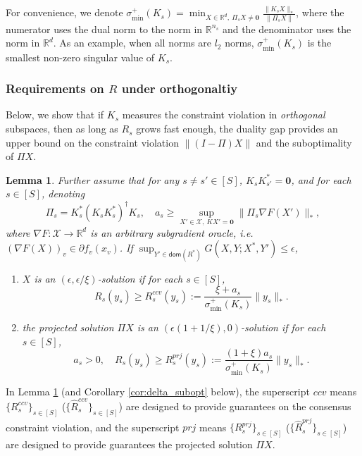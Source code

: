\documentclass[10pt]{article}
\newcommand{\mc}{\mathcal}
\newcommand{\mb}{\mathbf}
\newcommand{\R}{\mathbb{R}}
\newcommand{\domain}{\mathsf{dom}}
\newtheorem{lemma}{Lemma}[section]
\begin{document}
For convenience, we denote $\sigma_{\min}^+(K_s) = \min_{X\in \R^{d},~\Pi_s X\neq \mb 0}\frac{\|K_sX\|_*}{\|\Pi_s X\|}$, where the numerator uses the dual norm to the norm in $\R^{n_s}$ and the denominator uses the norm in $\R^{d}$. As an example, when all norms are $l_2$ norms, $\sigma_{\min}^+(K_s)$ is the smallest non-zero singular value of $K_s$. 





\subsubsection{Requirements on $R$ under orthogonaltiy}
Below, we show that if $K_s$ measures the constraint violation in \textit{orthogonal} subspaces, then as long as $R_s$ grows fast enough, the duality gap provides an upper bound on the constraint violation $\|(I-\Pi)X\|$ and the suboptimality of $\Pi X$. 


\begin{lemma}\label{lm:delta-subopt}
   Further assume that for any $s\neq s'\in [S]$, $K_sK_{s'}^* = \mb 0$, and for each $s\in [S]$, denoting
    \begin{displaymath}
        \Pi_s = K_s^*(K_sK_s^*)^{\dagger}K_s,\quad a_s \geq \sup_{X'\in {\mc X},~KX' = \mb 0} \|\Pi_s\nabla F(X')\|_*,
    \end{displaymath}
    where $\nabla F:{\mc X}\to \R^{d}$ is an arbitrary subgradient oracle, i.e. $(\nabla F(X))_v\in \partial f_v(x_v)$. If $\sup_{Y'\in \domain(R^*)} G(X,Y;X^*,Y')\leq \epsilon$, 
    \begin{enumerate}
        \item $X$ is an $(\epsilon,\epsilon/\xi)$-solution if for each $s\in [S]$,
    \begin{equation}\label{eq:r_s_1}
        R_s(y_s) \geq R^{ccv}_s(y_s):=\frac{\xi + a_s}{\sigma_{\min}^+(K_s)}\|y_s\|_*.
    \end{equation}
    
    \item  the projected solution $\Pi X$ is an $(\epsilon(1+1/\xi),0)$-solution if for each $s\in [S]$, 
    \begin{equation}\label{eq:r_s_2}
        a_s>0,\quad R_s(y_s) \geq R^{prj}_s(y_s):=\frac{(1+\xi) a_s}{\sigma_{\min}^+(K_s)}\|y_s\|_*.
    \end{equation}
    \end{enumerate}
\end{lemma}
In Lemma \ref{lm:delta-subopt} (and Corollary \ref{cor:delta_subopt} below), the superscript $ccv$ means $\{R^{ccv}_s\}_{s\in [S]}$ ($\{\widehat{R}^{ccv}_s\}_{s\in [S]}$) are designed to provide guarantees on the consensus constraint violation, and the superscript $prj$ means $\{R^{prj}_s\}_{s\in [S]}$ ($\{\widehat{R}^{prj}_s\}_{s\in [S]}$) are designed to provide guarantees the projected solution $\Pi X$. 
\end{document}
